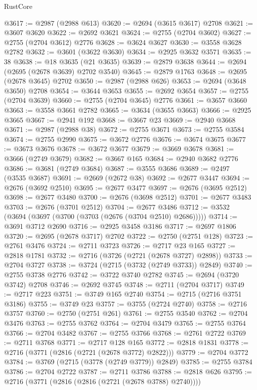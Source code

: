 \begin{lexlean}{RustCore}
\begin{coremodule}
@3617 := @2987 (@2988 @613)
@3620 := @2694 (@3615 @3617) @2708
@3621 := @3607 @3620
@3622 := @2692 @3621
@3624 := @2755 (@2704 @3602)
@3627 := @2755 (@2704 @3612) @2776
@3628 := @3624 @3627
@3630 := @3558 @3628 @2782
@3632 := @3601 (@3622 @3630)
@3634 := @2925 @3632 @3571
@3635 := 38
@3638 := @18 @3635 (@21 @3635)
@3639 := @2879 @3638
@3644 := @2694 (@2695 (@2678 @3639) @2702 @3540)
@3645 := @2879 @1763
@3648 := @2695 (@2678 @3645) @2702
@3650 := @2987 (@2988 @626)
@3653 := @2694 (@3648 @3650) @2708
@3654 := @3644 @3653
@3655 := @2692 @3654
@3657 := @2755 (@2704 @3639)
@3660 := @2755 (@2704 @3645) @2776
@3661 := @3657 @3660
@3663 := @3558 @3661 @2782
@3665 := @3634 (@3655 @3663)
@3666 := @2925 @3665
@3667 := @2941 @192
@3668 := @3667 @23
@3669 := @2940 @3668
@3671 := @2987 (@2988 @38)
@3672 := @2755 @3671
@3673 := @2755 @3584
@3674 := @2755 @2990
@3675 := @3672 @2776
@3676 := @3674 @3675
@3677 := @3673 @3676
@3678 := @3672 @3677
@3679 := @3669 @3678
@3681 := @3666 (@2749 @3679)
@3682 := @3667 @165
@3684 := @2940 @3682 @2776
@3686 := @3681 (@2749 @3684)
@3687 := @3555 @3686
@3689 := @2497 (@3535 @3687)
@3691 := @2669 (@2672 @38)
@3692 := @2677 @3447
@3694 := @2676 (@3692 @2510)
@3695 := @2677 @3477
@3697 := @2676 (@3695 @2512)
@3698 := @2677 @3480
@3700 := @2676 (@3698 @2512)
@3701 := @2677 @3483
@3703 := @2676 (@3701 @2512)
@3704 := @2677 @3486
@3712 := @3532 (@3694 (@3697 (@3700 (@3703 (@2676 (@3704 @2510) @2686)))))
@3714 := @3691 @3712 @2690
@3716 := @2925 @3458 @3186
@3717 := @2697 @1806
@3720 := @2695 (@2678 @3717) @2702
@3722 := @2750 (@2751 @128)
@3723 := @2761 @3476
@3724 := @2711 @3723
@3726 := @2717 @23 @165
@3727 := @2818 @1781
@3732 := @2716 (@3726 (@2721 (@2678 @3727) @2898))
@3733 := @2704 @3727
@3738 := @3724 (@2715 (@3732 (@2749 @3733)) @2849)
@3740 := @2755 @3738 @2776
@3742 := @3722 @3740 @2782
@3745 := @2694 (@3720 @3742) @2708
@3746 := @2692 @3745
@3748 := @2711 (@2704 @3717)
@3749 := @2717 @223
@3751 := @3749 @165 @2740
@3754 := @2715 (@2716 @3751 @3186)
@3755 := @3749 @23
@3757 := @3755 (@2724 @2740)
@3758 := @2716 @3757
@3760 := @2750 (@2751 @261)
@3761 := @2755 @3540
@3762 := @2704 @3476
@3763 := @2755 @3762
@3764 := @2704 @3479
@3765 := @2755 @3764
@3766 := @2704 @3482
@3767 := @2755 @3766
@3768 := @2761 @2722
@3769 := @2711 @3768
@3771 := @2717 @128 @165
@3772 := @2818 @1831
@3778 := @2716 (@3771 (@2816 (@2721 (@2678 @3772) @2822)))
@3779 := @2704 @3772
@3784 := @3769 (@2715 (@3778 (@2749 @3779)) @2849)
@3785 := @2755 @3784
@3786 := @2704 @2722
@3787 := @2711 @3786
@3788 := @2818 @626
@3795 := @2716 (@3771 (@2816 (@2816 (@2721 (@2678 @3788) @2740))))

\end{coremodule}
\end{lexlean}
